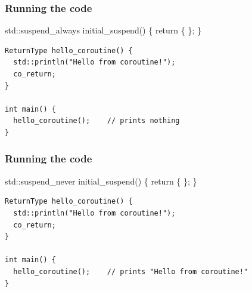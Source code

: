 \documentclass[aspectratio=169]{beamer}
\begin{document}
\begin{frame}[fragile]

  \frametitle{Running the code}

  \begin{semiverbatim}
\alert<2>{std::suspend_always} initial_suspend() \{ return \{ \}; \}
  \end{semiverbatim}

  \begin{lstlisting}[style=cpp20]
ReturnType hello_coroutine() {
  std::println("Hello from coroutine!");
  co_return;
}

int main() {
  hello_coroutine();    // prints nothing
}
\end{lstlisting}


\end{frame}


\begin{frame}[fragile]

  \frametitle{Running the code}

  \begin{semiverbatim}
\alert<1>{std::suspend_never}  initial_suspend() \{ return \{ \}; \}
  \end{semiverbatim}

  \begin{lstlisting}[style=cpp20]
ReturnType hello_coroutine() {
  std::println("Hello from coroutine!");
  co_return;
}

int main() {
  hello_coroutine();    // prints "Hello from coroutine!"
}
\end{lstlisting}


\end{frame}
\end{document}
